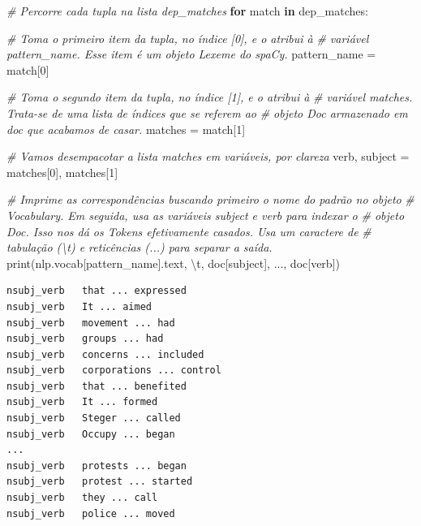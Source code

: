 \documentclass[
  brazilian,
]{article}
\newenvironment{Shaded}{}{}
\newcommand{\BuiltInTok}[1]{#1}
\newcommand{\CharTok}[1]{\textcolor[rgb]{0.25,0.44,0.63}{#1}}
\newcommand{\CommentTok}[1]{\textcolor[rgb]{0.38,0.63,0.69}{\textit{#1}}}
\newcommand{\ControlFlowTok}[1]{\textcolor[rgb]{0.00,0.44,0.13}{\textbf{#1}}}
\newcommand{\DecValTok}[1]{\textcolor[rgb]{0.25,0.63,0.44}{#1}}
\newcommand{\KeywordTok}[1]{\textcolor[rgb]{0.00,0.44,0.13}{\textbf{#1}}}
\newcommand{\NormalTok}[1]{#1}
\newcommand{\OperatorTok}[1]{\textcolor[rgb]{0.40,0.40,0.40}{#1}}
\newcommand{\StringTok}[1]{\textcolor[rgb]{0.25,0.44,0.63}{#1}}
\begin{document}
\begin{Shaded}
\begin{Highlighting}[]
\CommentTok{\# Percorre cada tupla na lista \textquotesingle{}dep\_matches\textquotesingle{}}
\ControlFlowTok{for}\NormalTok{ match }\KeywordTok{in}\NormalTok{ dep\_matches:}

    \CommentTok{\# Toma o primeiro item da tupla, no índice [0], e o atribui à}
    \CommentTok{\# variável \textquotesingle{}pattern\_name\textquotesingle{}. Esse item é um objeto Lexeme do spaCy.}
\NormalTok{    pattern\_name }\OperatorTok{=}\NormalTok{ match[}\DecValTok{0}\NormalTok{]}

    \CommentTok{\# Toma o segundo item da tupla, no índice [1], e o atribui à}
    \CommentTok{\# variável \textquotesingle{}matches\textquotesingle{}. Trata{-}se de uma lista de índices que se referem ao}
    \CommentTok{\# objeto Doc armazenado em \textquotesingle{}doc\textquotesingle{} que acabamos de casar.}
\NormalTok{    matches }\OperatorTok{=}\NormalTok{ match[}\DecValTok{1}\NormalTok{]}

    \CommentTok{\# Vamos desempacotar a lista \textquotesingle{}matches\textquotesingle{} em variáveis, por clareza}
\NormalTok{    verb, subject }\OperatorTok{=}\NormalTok{ matches[}\DecValTok{0}\NormalTok{], matches[}\DecValTok{1}\NormalTok{]}

    \CommentTok{\# Imprime as correspondências buscando primeiro o nome do padrão no objeto}
    \CommentTok{\# Vocabulary. Em seguida, usa as variáveis \textquotesingle{}subject\textquotesingle{} e \textquotesingle{}verb\textquotesingle{} para indexar o}
    \CommentTok{\# objeto Doc. Isso nos dá os Tokens efetivamente casados. Usa um caractere de}
    \CommentTok{\# tabulação (\textquotesingle{}\textbackslash{}t\textquotesingle{}) e reticências (\textquotesingle{}...\textquotesingle{}) para separar a saída.}
    \BuiltInTok{print}\NormalTok{(nlp.vocab[pattern\_name].text, }\StringTok{\textquotesingle{}}\CharTok{\textbackslash{}t}\StringTok{\textquotesingle{}}\NormalTok{, doc[subject], }\StringTok{\textquotesingle{}...\textquotesingle{}}\NormalTok{, doc[verb])}
\end{Highlighting}
\end{Shaded}

\begin{verbatim}
nsubj_verb   that ... expressed
nsubj_verb   It ... aimed
nsubj_verb   movement ... had
nsubj_verb   groups ... had
nsubj_verb   concerns ... included
nsubj_verb   corporations ... control
nsubj_verb   that ... benefited
nsubj_verb   It ... formed
nsubj_verb   Steger ... called
nsubj_verb   Occupy ... began
...
nsubj_verb   protests ... began
nsubj_verb   protest ... started
nsubj_verb   they ... call
nsubj_verb   police ... moved
\end{verbatim}
\end{document}
